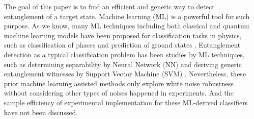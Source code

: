 \documentclass[
aps,
pra,
twocolumn,
floatfix,
]{revtex4-2}
\theoremstyle{plain}
\theoremstyle{definition}
\begin{document}
The goal of this paper is to find an efficient and generic way to detect entanglement of a target state. 
Machine learning (ML) is a powerful tool for such purpose. 
As we know, many ML techniques including both classical and quantum machine learning models have been proposed for classification tasks in physics, such as classification of phases and prediction of ground states \cite{carrasquillaMachineLearningPhases2017,congQuantumConvolutionalNeural2019,huangProvablyEfficientMachine2022}.
Entanglement detection as a typical classification problem has been studies by ML techniques, such as determining separability by Neural Network (NN) \cite{luSeparabilityEntanglementClassifierMachine2018,maTransformingBellInequalities2018} and deriving generic entanglement witnesses by Support Vector Machine (SVM) \cite{zhuMachineLearningDerivedEntanglement2021,vintskevichClassificationFourqubitEntangled2022}. 
Nevertheless, these prior machine learning assisted methods 
only explore white noise robustness without considering other types of noises happened in experiments.
And the sample efficiency of experimental implementation for these ML-derived classifiers have not been discussed.
\end{document}
